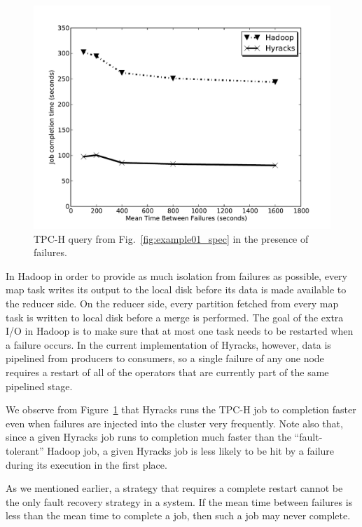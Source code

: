 \begin{figure} [htb!]
  \centering
  \includegraphics[scale=0.6]{images/tpch-fault-tolerance}
  \caption{TPC-H query from Fig.~\ref{fig:example01_spec} in the presence of failures.}
  \label{fig:tpch-fault-tolerance}
\end{figure}

In Hadoop in order to provide as much isolation from failures as possible, every
map task writes its output to the local disk before its data is made available to the reducer side. On the reducer side, every partition fetched from every map task is written
to local disk before a merge is performed. The goal of the extra I/O in Hadoop is to make sure that at most one task needs to be restarted when a failure occurs. In the current
implementation of Hyracks, however, data is pipelined from producers to consumers, so a single failure of any one node requires a restart of all of the operators that are 
currently part of the same pipelined stage.

We observe from Figure~\ref{fig:tpch-fault-tolerance} that Hyracks runs the TPC-H job to completion faster even when failures are injected into the cluster very frequently.
Note also that, since a given Hyracks job runs to completion much faster than the ``fault-tolerant'' Hadoop job, a given Hyracks job is less likely to be hit by a failure
during its execution in the first place.

As we mentioned earlier, a strategy
that requires a complete restart cannot be the only fault recovery strategy in a system. If the mean time between failures is less than the mean time to complete a
job, then such a job
may never complete.

